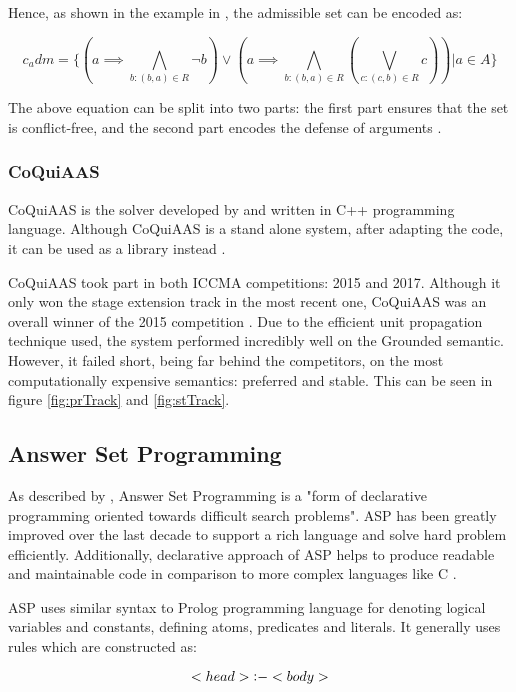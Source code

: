 Hence, as shown in the example in \citet{solvingMethods}, the admissible set can be encoded as:

\begin{equation}
c_adm = \{(a \implies \bigwedge\limits_{ b : (b,a) \in R } \neg  b) \lor (a \implies \bigwedge\limits_{b:(b,a) \in R} (\bigvee\limits_{c:(c,b) \in R} c) ) | a \in A\}
\end{equation}

The above equation can be split into two parts: the first part ensures that the set is conflict-free, and the second part encodes the defense of arguments \citep{csp2}. 

\subsubsection{CoQuiAAS}
CoQuiAAS is the solver developed by \citet{coquiaas} and written in C++ programming language. Although CoQuiAAS is a stand alone system, after adapting the code, it can be used as a library instead \citep{coquiaas}.

CoQuiAAS took part in both ICCMA competitions: 2015 and 2017. Although it only won the stage extension track in the most recent one, CoQuiAAS was an overall winner of the 2015 competition \citep{iccma2015}. Due to the efficient unit propagation technique used, the system performed incredibly well on the Grounded semantic. However, it failed short, being far behind the competitors, on the most computationally expensive semantics: preferred and stable. This can be seen in figure \ref{fig:prTrack} and \ref{fig:stTrack}.

\subsection{Answer Set Programming}
As described by \citet{asp}, Answer Set Programming is a "form of declarative programming oriented towards difficult search problems". ASP has been greatly improved over the last decade to support a rich language and solve hard problem efficiently. Additionally, declarative approach of ASP helps to produce readable and maintainable code in comparison to more complex languages like C \citep{solvingMethods}.

ASP uses similar syntax to Prolog programming language for denoting logical variables and constants, defining atoms, predicates and literals. It generally uses rules which are constructed as:

\begin{equation}
	<head> \mathop{\vcenter{\hbox{$:$}}-}  <body>
\end{equation}

